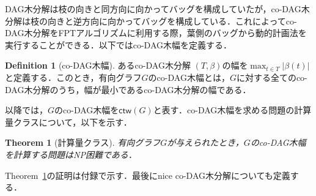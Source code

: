\documentclass[master]{kuisthesis}		%
\theoremstyle{plain}
\newtheorem{theorem}{Theorem}
\theoremstyle{definition}
\newtheorem{definition*}{Definition}
\begin{document}
DAG木分解は枝の向きと同方向に向かってバッグを構成していたが，co-DAG木分解は枝の向きと逆方向に向かってバッグを構成している．これによってco-DAG木分解をFPTアルゴリズムに利用する際，葉側のバッグから動的計画法を実行することができる．以下ではco-DAG木幅を定義する．

\begin{definition*}[co-DAG木幅]
    あるco-DAG木分解 $(T, \beta)$の幅を$\max_{t \in T}|\beta(t)|$と定義する．このとき，有向グラフ$G$のco-DAG木幅とは，$G$に対する全てのco-DAG木分解のうち，幅が最小であるco-DAG木分解の幅である．
\end{definition*}


以降では，$G$のco-DAG木幅を$\mathsf{ctw}(G)$と表す．co-DAG木幅を求める問題の計算量クラスについて，以下を示す．


\begin{theorem}[計算量クラス]\label{r-NP困難}
    有向グラフ$G$が与えられたとき，$G$のco-DAG木幅を計算する問題はNP困難である．
\end{theorem}

Theorem~\ref{r-NP困難}の証明は付録で示す．最後にnice co-DAG木分解についても定義する．
\end{document}
